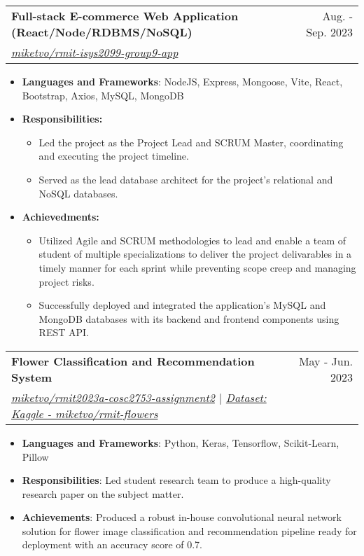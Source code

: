 \documentclass[a4paper,11pt]{article}
\makeatletter
\newcommand{\resumeItemHeading}[1]{\item\small{\textbf{#1:}}\vspace{-1.6pt}}
\newcommand{\resumeItemPlain}[1]{
  \setstretch{0.96}
  \item\small{
    {#1 \vspace{-1pt}}
  }
  \setstretch{1.0}
}
\newcommand{\resumeItem}[2]{
  \item\small{
    \textbf{#1}{: #2 \vspace{-2pt}}
  }
}
\newcommand{\resumeSubheading}[4]{
  \vspace{-2pt}\item
    \begin{tabular*}{0.97\textwidth}{l@{\extracolsep{\fill}}r}
      \textbf{#1} & #2 \\
      \textit{\small#3} & \textit{\small #4} \\
    \end{tabular*}\vspace{-5pt}
}
\newcommand{\resumeItemListStart}{\begin{itemize}[leftmargin=16pt]}
\newcommand{\resumeItemListEnd}{\end{itemize}\vspace{-2pt}}
\newcommand{\resumeSubItemListStart}{\begin{itemize}[leftmargin=*]}
\newcommand{\resumeSubItemListEnd}{\end{itemize}\vspace{-2pt}}
\makeatother
\begin{document}
    \resumeSubheading
      {Full-stack E-commerce Web Application (React/Node/RDBMS/NoSQL)}{Aug. - Sep. 2023}
      {\href{https://github.com/miketvo/rmit-isys2099-group9-app}{\faGithub\space miketvo/rmit-isys2099-group9-app}}{}
      \resumeItemListStart
        \resumeItem{Languages and Frameworks}
          {NodeJS, Express, Mongoose, Vite, React, Bootstrap, Axios, MySQL, MongoDB}
        \resumeItemHeading{Responsibilities}
          \resumeSubItemListStart
            \resumeItemPlain
              {Led the project as the Project Lead and SCRUM Master, coordinating and executing the project timeline.}
            \resumeItemPlain
              {Served as the lead database architect for the project's relational and NoSQL databases.}
          \resumeSubItemListEnd
        \resumeItemHeading{Achievedments}
          \resumeSubItemListStart
            \resumeItemPlain
              {Utilized Agile and SCRUM methodologies to lead and enable a team of student of multiple specializations to deliver the project delivarables in a timely manner for each sprint while preventing scope creep and managing project risks.}
            \resumeItemPlain
              {Successfully deployed and integrated the application's MySQL and MongoDB databases with its backend and frontend components using REST API.}
          \resumeSubItemListEnd
      \resumeItemListEnd

    \resumeSubheading
      {Flower Classification and Recommendation System}{May - Jun. 2023}
      {\href{https://github.com/miketvo/rmit2023a-cosc2753-assignment2}{\faGithub\space miketvo/rmit2023a-cosc2753-assignment2} $|$ \href{https://www.kaggle.com/datasets/miketvo/rmit-flowers/}{\faDatabase\space Dataset: Kaggle - miketvo/rmit-flowers}}{}
      \resumeItemListStart
        \resumeItem{Languages and Frameworks}
          {Python, Keras, Tensorflow, Scikit-Learn, Pillow}
          \resumeItem{Responsibilities}
            {Led student research team to produce a high-quality research paper on the subject matter.}
          \resumeItem{Achievements}
            {Produced a robust in-house convolutional neural network solution for flower image classification and recommendation pipeline ready for deployment with an accuracy score of 0.7.}
      \resumeItemListEnd
\end{document}
